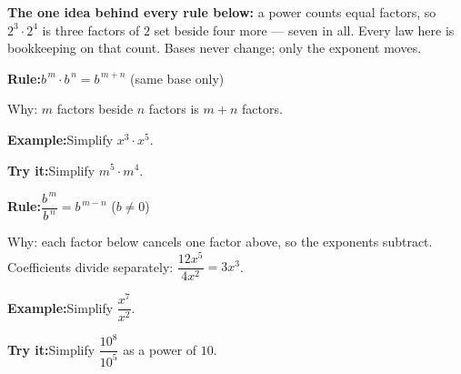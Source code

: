 \documentclass[12pt]{article}
\begin{document}

\begin{formulabox}\textbf{The one idea behind every rule below:} a power counts
equal factors, so $2^3 \cdot 2^4$ is three factors of $2$ set beside four more
--- seven in all. Every law here is bookkeeping on that count. Bases never
change; only the exponent moves.
\end{formulabox}


\begin{formulabox}\textbf{Rule:}\quad $b^{\,m} \cdot b^{\,n} = b^{\,m+n}$
\quad (same base only)\par
Why: $m$ factors beside $n$ factors is $m+n$ factors.
\end{formulabox}

\begin{examplebox}\textbf{Example:}\quad Simplify $x^3 \cdot x^5$.
\end{examplebox}

\begin{tryitbox}\textbf{Try it:}\quad Simplify $m^5 \cdot m^4$.
\ \end{tryitbox}


\begin{formulabox}\textbf{Rule:}\quad $\dfrac{b^{\,m}}{b^{\,n}} = b^{\,m-n}$
\quad ($b \neq 0$)\par
Why: each factor below cancels one factor above, so the exponents subtract.
Coefficients divide separately: $\dfrac{12x^5}{4x^2} = 3x^3$.
\end{formulabox}

\begin{examplebox}\textbf{Example:}\quad Simplify $\dfrac{x^7}{x^2}$.
\end{examplebox}

\begin{tryitbox}\textbf{Try it:}\quad Simplify $\dfrac{10^8}{10^5}$ as a power
of $10$.
\ \end{tryitbox}
\end{document}
